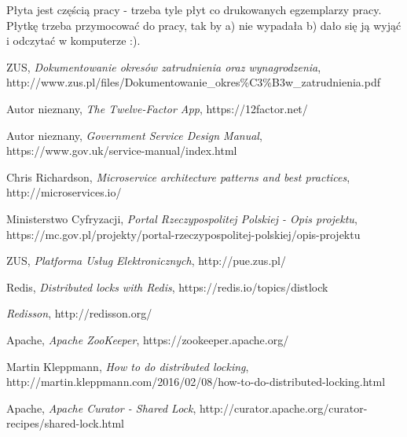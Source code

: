 \documentclass[licencjacka]{pracamgr}
\begin{document}
Płyta jest częścią pracy - trzeba tyle płyt co drukowanych egzemplarzy pracy. Płytkę trzeba przymocować do pracy, tak by a) nie wypadała b) dało się ją wyjąć i odczytać w komputerze :).

\begin{thebibliography}{99}

 ZUS, \textit{Dokumentowanie okresów zatrudnienia oraz
	wynagrodzenia}, http://www.zus.pl/files/Dokumentowanie\_okres\%C3\%B3w\_zatrudnienia.pdf

 Autor nieznany, \textit{The Twelve-Factor App}, https://12factor.net/

 Autor nieznany, \textit{Government Service Design Manual},
https://www.gov.uk/service-manual/index.html

 Chris Richardson, \textit{Microservice architecture patterns and best practices},
http://microservices.io/

 Ministerstwo Cyfryzacji, \textit{Portal Rzeczypospolitej Polskiej - Opis projektu},
https://mc.gov.pl/projekty/portal-rzeczypospolitej-polskiej/opis-projektu

 ZUS, \textit{Platforma Usług Elektronicznych},
http://pue.zus.pl/

 Redis, \textit{Distributed locks with Redis},
https://redis.io/topics/distlock

 \textit{Redisson},
http://redisson.org/

 Apache, \textit{Apache ZooKeeper},
https://zookeeper.apache.org/

 Martin Kleppmann, \textit{How to do distributed locking},
http://martin.kleppmann.com/2016/02/08/how-to-do-distributed-locking.html

 Apache, \textit{Apache Curator - Shared Lock},
http://curator.apache.org/curator-recipes/shared-lock.html

\end{thebibliography}
\end{document}

